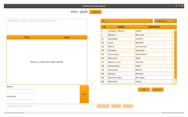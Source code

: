 \documentclass[a4paper]{article}
\begin{document}
\begin{figure}[h]
\centering
\includegraphics[width=0.88\textwidth]{images/screens/admin0}
\label{fig:admin0}
\end{figure}
\end{document}

